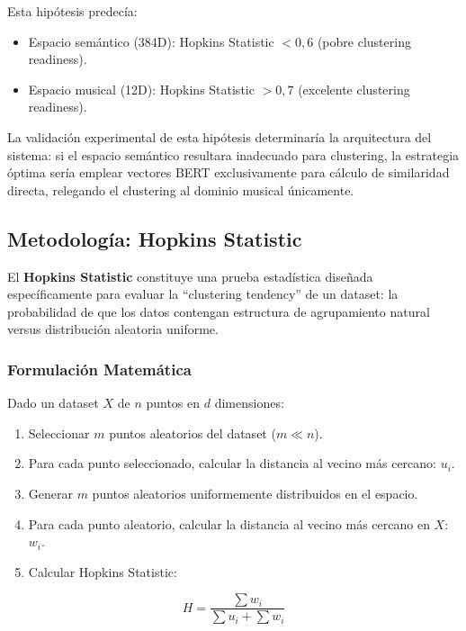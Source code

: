 Esta hipótesis predecía:
\begin{itemize}
    \item Espacio semántico (384D): Hopkins Statistic $< 0{,}6$ (pobre clustering readiness).
    \item Espacio musical (12D): Hopkins Statistic $> 0{,}7$ (excelente clustering readiness).
\end{itemize}

La validación experimental de esta hipótesis determinaría la arquitectura del sistema: si el espacio semántico resultara inadecuado para clustering, la estrategia óptima sería emplear vectores BERT exclusivamente para cálculo de similaridad directa, relegando el clustering al dominio musical únicamente.

\subsection{Metodología: Hopkins Statistic}
\label{subsec:metodologia-hopkins}

El \textbf{Hopkins Statistic} constituye una prueba estadística diseñada específicamente para evaluar la ``clustering tendency'' de un dataset: la probabilidad de que los datos contengan estructura de agrupamiento natural versus distribución aleatoria uniforme.

\subsubsection{Formulación Matemática}

Dado un dataset $X$ de $n$ puntos en $d$ dimensiones:
\begin{enumerate}
    \item Seleccionar $m$ puntos aleatorios del dataset ($m \ll n$).
    \item Para cada punto seleccionado, calcular la distancia al vecino más cercano: $u_i$.
    \item Generar $m$ puntos aleatorios uniformemente distribuidos en el espacio.
    \item Para cada punto aleatorio, calcular la distancia al vecino más cercano en $X$: $w_i$.
    \item Calcular Hopkins Statistic:
\end{enumerate}

\begin{equation}
\label{eq:hopkins}
H = \frac{\sum w_i}{\sum u_i + \sum w_i}
\end{equation}

